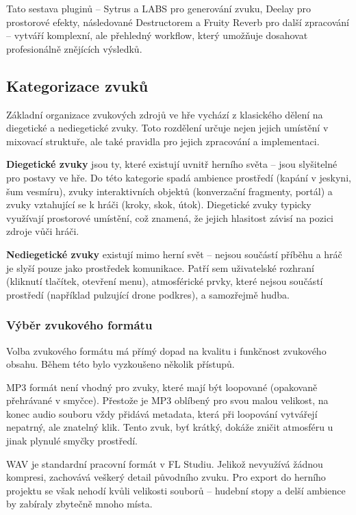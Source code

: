 Tato sestava pluginů -- Sytrus a LABS pro generování zvuku, Deelay pro prostorové efekty, následované Destructorem a Fruity Reverb pro další zpracování -- vytváří komplexní, ale přehledný workflow, který umožňuje dosahovat profesionálně znějících výsledků.

\subsection{Kategorizace zvuků}
\label{sec:kategorizace-zvuku}

Základní organizace zvukových zdrojů ve hře vychází z klasického dělení na diegetické a nediegetické zvuky. Toto rozdělení určuje nejen jejich umístění v mixovací struktuře, ale také pravidla pro jejich zpracování a implementaci.

\textbf{Diegetické zvuky} jsou ty, které existují uvnitř herního světa -- jsou slyšitelné pro postavy ve hře. Do této kategorie spadá ambience prostředí (kapání v jeskyni, šum vesmíru), zvuky interaktivních objektů (konverzační fragmenty, portál) a zvuky vztahující se k hráči (kroky, skok, útok). Diegetické zvuky typicky využívají prostorové umístění, což znamená, že jejich hlasitost závisí na pozici zdroje vůči hráči.

\textbf{Nediegetické zvuky} existují mimo herní svět -- nejsou součástí příběhu a hráč je slyší pouze jako prostředek komunikace. Patří sem uživatelské rozhraní (kliknutí tlačítek, otevření menu), atmosférické prvky, které nejsou součástí prostředí (například pulzující drone podkres), a samozřejmě hudba.

\subsubsection{Výběr zvukového formátu}
Volba zvukového formátu má přímý dopad na kvalitu i funkčnost zvukového obsahu. Během této bylo vyzkoušeno několik přístupů.

MP3 formát není vhodný pro zvuky, které mají být loopované (opakovaně přehrávané v smyčce). Přestože je MP3 oblíbený pro svou malou velikost, na konec audio souboru vždy přidává metadata, která při loopování vytvářejí nepatrný, ale znatelný klik. Tento zvuk, byť krátký, dokáže zničit atmosféru u jinak plynulé smyčky prostředí.

WAV je standardní pracovní formát v FL Studiu. Jelikož nevyužívá žádnou kompresi,   zachovává veškerý detail původního zvuku. Pro export do herního projektu se však nehodí kvůli velikosti souborů -- hudební stopy a delší ambience by zabíraly zbytečně mnoho místa.

